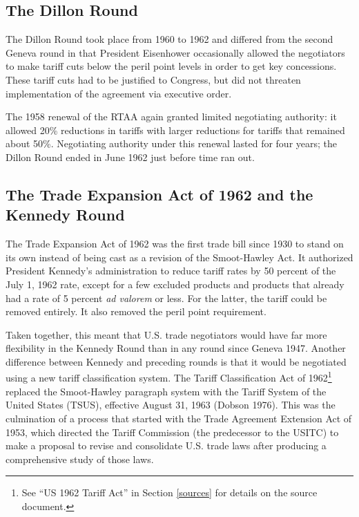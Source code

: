 \documentclass[
  12pt,
]{article}
\begin{document}
\hypertarget{the-dillon-round}{%
\subsection{The Dillon Round}\label{the-dillon-round}}

The Dillon Round took place from 1960 to 1962 and differed from the second Geneva round in that President Eisenhower occasionally allowed the negotiators to make tariff cuts below the peril point levels in order to get key concessions. These tariff cuts had to be justified to Congress, but did not threaten implementation of the agreement via executive order.

The 1958 renewal of the RTAA again granted limited negotiating authority: it allowed 20\% reductions in tariffs with larger reductions for tariffs that remained about 50\%. Negotiating authority under this renewal lasted for four years; the Dillon Round ended in June 1962 just before time ran out.

\hypertarget{TSUS}{%
\subsection{The Trade Expansion Act of 1962 and the Kennedy Round}\label{TSUS}}

The Trade Expansion Act of 1962 was the first trade bill since 1930 to stand on its own instead of being cast as a revision of the Smoot-Hawley Act. It authorized President Kennedy's administration to reduce tariff rates by 50 percent of the July 1, 1962 rate, except for a few excluded products and products that already had a rate of 5 percent \emph{ad valorem} or less. For the latter, the tariff could be removed entirely. It also removed the peril point requirement.

Taken together, this meant that U.S. trade negotiators would have far more flexibility in the Kennedy Round than in any round since Geneva 1947. Another difference between Kennedy and preceding rounds is that it would be negotiated using a new tariff classification system. The Tariff Classification Act of 1962\footnote{See ``US 1962 Tariff Act'' in Section \ref{sources} for details on the source document.} replaced the Smoot-Hawley paragraph system with the Tariff System of the United States (TSUS), effective August 31, 1963 (Dobson 1976). This was the culmination of a process that started with the Trade Agreement Extension Act of 1953, which directed the Tariff Commission (the predecessor to the USITC) to make a proposal to revise and consolidate U.S. trade laws after producing a comprehensive study of those laws.
\end{document}
